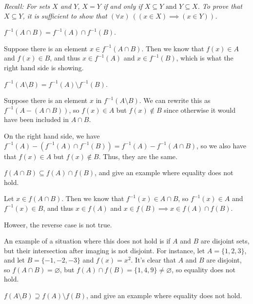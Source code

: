 \documentclass[11pt]{article}
\begin{document}
\textit{Recall: For sets $X$ and $Y$, $X=Y$ if and only if $X \subseteq Y \text{ and } Y \subseteq X$. To prove that $X \subseteq Y$, it is sufficient to show that $(\forall x)~((x \in X) \implies (x \in Y))$.}

\begin{Parts}
    \Part $f^{-1}(A \cap B) = f^{-1}(A) \cap f^{-1}(B)$.

    \begin{solution}
        Suppose there is an element $x \in f^{-1}(A \cap B)$. Then we know that $f(x) \in A$ and $f(x) \in B$, and thus $x \in f^{-1}(A)$ and $x \in f^{-1}(B)$, which is what the right hand side is showing.
    \end{solution}
    \Part $f^{-1}(A \setminus B) = f^{-1}(A) \setminus f^{-1}(B)$.

    \begin{solution}
        Suppose there is an element $x$ in $f^{-1}(A \setminus B)$. We can rewrite this as $f^{-1}(A - (A \cap B))$, so $f(x) \in A$ but $f(x) \notin B$ since otherwise it would have been included in $A \cap B$.

        
        On the right hand side, we have $f^{-1}(A) - (f^{-1}(A) \cap f^{-1}(B)) = f^{-1}(A) - f^{-1}(A \cap B)$, so we also have that $f(x) \in A$ but $f(x) \notin B$. Thus, they are the same. 
    \end{solution}


    \Part $f(A \cap B) \subseteq f(A) \cap f(B)$, and give an example where equality does not hold.

    \begin{solution}
        Let $x \in f(A \cap B)$. Then we know that $f^{-1}(x) \in A \cap B$, so $f^{-1}(x) \in A$ and $f^{-1}(x) \in B$, and thus $x \in f(A)$ and $x \in f(B) \implies x \in f(A)\cap f(B)$. 

        Howeer, the reverse case is not true. 

        An example of a situation where this does not hold is if $A$ and $B$ are disjoint sets, but their intersection after imaging is not disjoint. For instance, let $A = \{1, 2, 3\}$, and let $B = \{-1, -2, -3\}$ and $f(x) = x^2$. It's clear that $A$ and $B$ are disjoint, so $f(A \cap B) = \varnothing$, but $f(A) \cap f(B) = \{1, 4, 9\} \neq \varnothing$, so equality does not hold.
    \end{solution}
    \Part $f(A \setminus B) \supseteq f(A) \setminus f(B)$, and give an example where equality does not hold.


\end{Parts}
\end{document}
